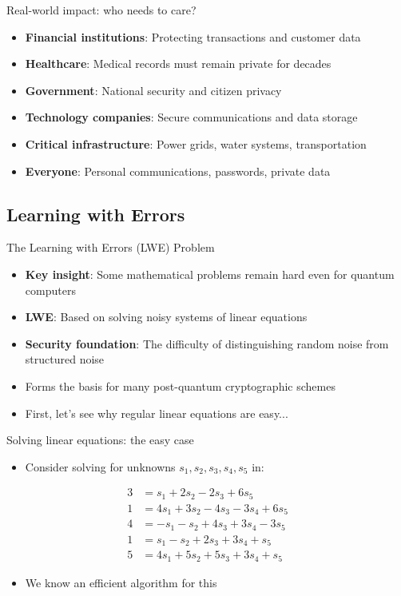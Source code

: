 \documentclass[aspectratio=169, lualatex, handout]{beamer}
\begin{document}
\begin{frame}{Real-world impact: who needs to care?}
	\begin{itemize}
		\item \textbf{Financial institutions}: Protecting transactions and customer data
		\item \textbf{Healthcare}: Medical records must remain private for decades
		\item \textbf{Government}: National security and citizen privacy
		\item \textbf{Technology companies}: Secure communications and data storage
		\item \textbf{Critical infrastructure}: Power grids, water systems, transportation
		\item \textbf{Everyone}: Personal communications, passwords, private data
	\end{itemize}
\end{frame}

\subsection{Learning with Errors}

\begin{frame}{The Learning with Errors (LWE) Problem}
	\begin{itemize}
		\item \textbf{Key insight}: Some mathematical problems remain hard even for quantum computers
		\item \textbf{LWE}: Based on solving noisy systems of linear equations
		\item \textbf{Security foundation}: The difficulty of distinguishing random noise from structured noise
		\item Forms the basis for many post-quantum cryptographic schemes
		\item First, let's see why regular linear equations are easy...
	\end{itemize}
\end{frame}

\begin{frame}{Solving linear equations: the easy case}
	\begin{itemize}
		\item Consider solving for unknowns $s_1, s_2, s_3, s_4, s_5$ in:
	\end{itemize}
	\begin{align*}
		3 & = s_1 + 2s_2 - 2s_3 + 6s_5         \\
		1 & = 4s_1 + 3s_2 - 4s_3 - 3s_4 + 6s_5 \\
		4 & = -s_1 - s_2 + 4s_3 + 3s_4 - 3s_5  \\
		1 & = s_1 - s_2 + 2s_3 + 3s_4 + s_5    \\
		5 & = 4s_1 + 5s_2 + 5s_3 + 3s_4 + s_5
	\end{align*}
	\begin{itemize}
		\item We know an efficient algorithm for this
	\end{itemize}
\end{frame}
\end{document}
